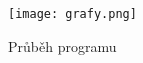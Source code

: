 
\begin{figure}[H]
  \centering
  \texttt{[image: grafy.png]}
  \caption{Průběh programu}
\end{figure}

